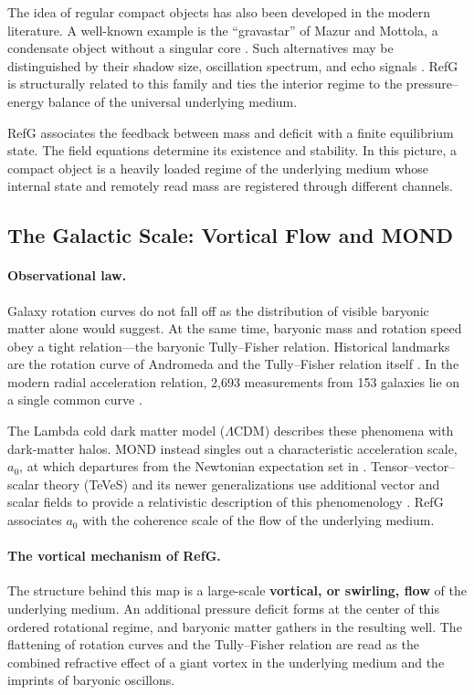 \documentclass[11pt,a4paper]{article}
\begin{document}
The idea of regular compact objects has also been developed in the modern literature. A well-known example is the ``gravastar'' of Mazur and Mottola, a condensate object without a singular core \citep{mazur2004}. Such alternatives may be distinguished by their shadow size, oscillation spectrum, and echo signals \citep{cardoso2019}. RefG is structurally related to this family and ties the interior regime to the pressure--energy balance of the universal underlying medium.

RefG associates the feedback between mass and deficit with a finite equilibrium state. The field equations determine its existence and stability. In this picture, a compact object is a heavily loaded regime of the underlying medium whose internal state and remotely read mass are registered through different channels.

\subsection{The Galactic Scale: Vortical Flow and MOND}

\paragraph{Observational law.} Galaxy rotation curves do not fall off as the distribution of visible baryonic matter alone would suggest. At the same time, baryonic mass and rotation speed obey a tight relation---the baryonic Tully--Fisher relation. Historical landmarks are the rotation curve of Andromeda \citep{rubin1970} and the Tully--Fisher relation itself \citep{tully1977}. In the modern radial acceleration relation, 2,693 measurements from 153 galaxies lie on a single common curve \citep{mcgaugh2016}.

The Lambda cold dark matter model ($\Lambda$CDM) describes these phenomena with dark-matter halos. MOND instead singles out a characteristic acceleration scale, $a_0$, at which departures from the Newtonian expectation set in \citep{milgrom1983}. Tensor--vector--scalar theory (TeVeS) and its newer generalizations use additional vector and scalar fields to provide a relativistic description of this phenomenology \citep{bekenstein2004,skordis2021}. RefG associates $a_0$ with the coherence scale of the flow of the underlying medium.

\paragraph{The vortical mechanism of RefG.} The structure behind this map is a large-scale \textbf{vortical, or swirling, flow} of the underlying medium. An additional pressure deficit forms at the center of this ordered rotational regime, and baryonic matter gathers in the resulting well. The flattening of rotation curves and the Tully--Fisher relation are read as the combined refractive effect of a giant vortex in the underlying medium and the imprints of baryonic oscillons.
\end{document}
